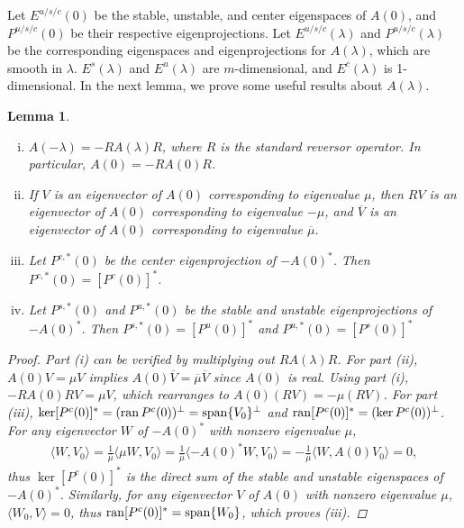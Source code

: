 \documentclass[12pt]{elsarticle}
\theoremstyle{plain}
\newtheorem{lemma}[theorem]{Lemma}
\theoremstyle{definition}
\theoremstyle{remark}
\numberwithin{theorem}{section}
\numberwithin{equation}{section}
\begin{document}
Let $E^{u/s/c}(0)$ be the stable, unstable, and center eigenspaces of $A(0)$, and $P^{u/s/c}(0)$ be their respective eigenprojections. Let $E^{u/s/c}(\lambda)$ and $P^{u/s/c}(\lambda)$ be the corresponding eigenspaces and eigenprojections for $A(\lambda)$, which are smooth in $\lambda$. $E^s(\lambda)$ and $E^u(\lambda)$ are $m$-dimensional, and $E^c(\lambda)$ is 1-dimensional. In the next lemma, we prove some useful results about $A(\lambda)$.

\begin{lemma}\label{lemma:Afacts}\leavevmode
\begin{enumerate}[(i)]
	\item $A(-\lambda) = -R A(\lambda)R$, where $R$ is the standard reversor operator. In particular, $A(0) = -R A(0)R$.
	\item If $V$ is an eigenvector of $A(0)$ corresponding to eigenvalue $\mu$, then $RV$ is an eigenvector of $A(0)$ corresponding to eigenvalue $-\mu$, and $\overline{V}$ is an eigenvector of $A(0)$ corresponding to eigenvalue $\overline{\mu}$. 
	\item Let $P^{c,*}(0)$ be the center eigenprojection of $-A(0)^*$. Then $P^{c,*}(0) = [P^c(0)]^*$. 
	\item Let $P^{s,*}(0)$ and $P^{u,*}(0)$ be the stable and unstable eigenprojections of $-A(0)^*$. Then $P^{s,*}(0) = [P^u(0)]^*$ and $P^{u,*}(0) = [P^s(0)]^*$
\end{enumerate}	
\begin{proof}
Part (i) can be verified by multiplying out $R A(\lambda)R$. For part (ii), $A(0)V = \mu V$ implies $A(0)\overline{V} = \overline{\mu}\overline{V}$ since $A(0)$ is real. Using part (i), $-R A(0) R V = \mu V$, which rearranges to $A(0) (RV) = -\mu(RV)$. For part (iii), $\mathop\mathrm{ker}\nolimits [P^c(0)]^* = (\operatorname{ran} P^c(0))^\perp = \operatorname{span}\{V_0\}^\perp$  and $\operatorname{ran} [P^c(0)]^* = (\mathop\mathrm{ker}\nolimits P^c(0))^\perp$. For any eigenvector $W$ of $-A(0)^*$ with nonzero eigenvalue $\mu$,
\begin{align*}
\langle W, V_0 \rangle = \frac{1}{\overline{\mu}} \langle \mu W, V_0 \rangle
= \frac{1}{\overline{\mu}}\langle -A(0)^* W, V_0 \rangle = -\frac{1}{\overline{\mu}}\langle W, A(0) V_0 \rangle = 0,
\end{align*}
thus $\ker [P^c(0)]^*$ is the direct sum of the stable and unstable eigenspaces of $-A(0)^*$. Similarly, for any eigenvector $V$ of $A(0)$ with nonzero eigenvalue $\mu$, $\langle W_0, V \rangle = 0$, thus $\operatorname{ran} [P^c(0)]^* = \operatorname{span}\{W_0\}$, which proves (iii).


\end{proof}
\end{lemma}
\end{document}
